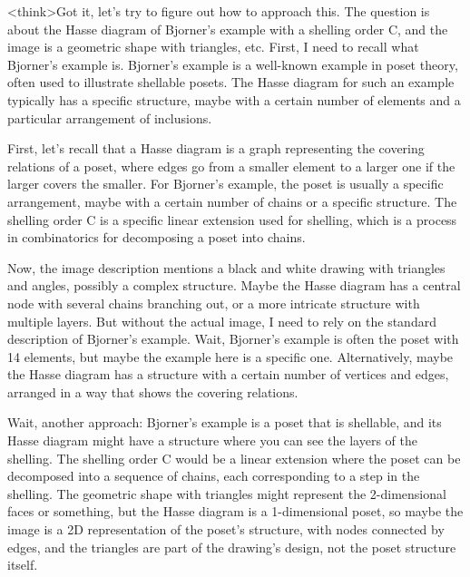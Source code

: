 <think>Got it, let's try to figure out how to approach this. The question is about the Hasse diagram of Bjorner's example with a shelling order C, and the image is a geometric shape with triangles, etc. First, I need to recall what Bjorner's example is. Bjorner's example is a well-known example in poset theory, often used to illustrate shellable posets. The Hasse diagram for such an example typically has a specific structure, maybe with a certain number of elements and a particular arrangement of inclusions.

First, let's recall that a Hasse diagram is a graph representing the covering relations of a poset, where edges go from a smaller element to a larger one if the larger covers the smaller. For Bjorner's example, the poset is usually a specific arrangement, maybe with a certain number of chains or a specific structure. The shelling order C is a specific linear extension used for shelling, which is a process in combinatorics for decomposing a poset into chains.

Now, the image description mentions a black and white drawing with triangles and angles, possibly a complex structure. Maybe the Hasse diagram has a central node with several chains branching out, or a more intricate structure with multiple layers. But without the actual image, I need to rely on the standard description of Bjorner's example. Wait, Bjorner's example is often the poset with 14 elements, but maybe the example here is a specific one. Alternatively, maybe the Hasse diagram has a structure with a certain number of vertices and edges, arranged in a way that shows the covering relations.

Wait, another approach: Bjorner's example is a poset that is shellable, and its Hasse diagram might have a structure where you can see the layers of the shelling. The shelling order C would be a linear extension where the poset can be decomposed into a sequence of chains, each corresponding to a step in the shelling. The geometric shape with triangles might represent the 2-dimensional faces or something, but the Hasse diagram is a 1-dimensional poset, so maybe the image is a 2D representation of the poset's structure, with nodes connected by edges, and the triangles are part of the drawing's design, not the poset structure itself.

